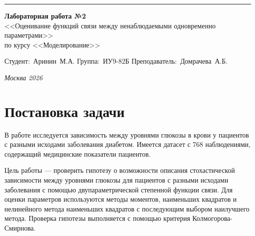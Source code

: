 \documentclass[a4paper, 14pt]{extarticle}
\begin{document}
\begin{titlepage}
\vspace*{-16pt}
\hspace{30pt}\rule{0.866\textwidth}{0.4pt}

\vspace{11em}

\begin{center}
\Large {\bf Лабораторная работа №2} \\ 
\large <<Оценивание функций связи между ненаблюдаемыми одновременно параметрами>> \\
\large {по курсу <<Моделирование>>} \\

\end{center}\normalsize

\vspace{8em}

\vbox{%
\hfill%
\vbox{%
\hbox{Студент: Аринин М.А.}%
\hbox{Группа: ИУ9-82Б}%
\hbox{Преподаватель: Домрачева А.Б.}%
}%
} 

\bigskip

\vfill


\begin{center}
\textsl{Москва 2026}
\end{center}
\end{titlepage}


\renewcommand{\ttdefault}{pcr}

\setlength{\tabcolsep}{3pt}

\newpage
\setcounter{page}{2}

\section{Постановка задачи}

В работе исследуется зависимость между уровнями глюкозы в крови у пациентов с разными исходами заболевания диабетом. Имеется датасет с 768 наблюдениями, содержащий медицинские показатели пациентов.

Цель работы --- проверить гипотезу о возможности описания стохастической зависимости между уровнями глюкозы для пациентов с разными исходами заболевания с помощью двупараметрической степенной функции связи. Для оценки параметров используются методы моментов, наименьших квадратов и нелинейного метода наименьших квадратов с последующим выбором наилучшего метода. Проверка гипотезы выполняется с помощью критерия Колмогорова-Смирнова.
\end{document}
